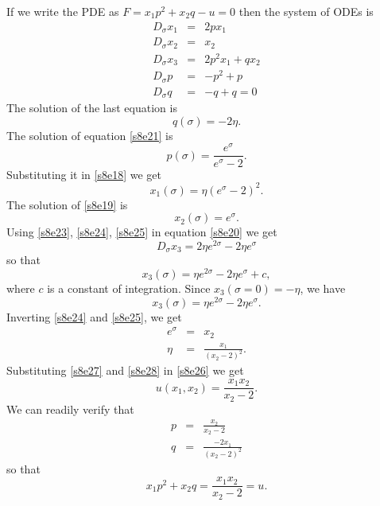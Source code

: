 \documentclass{article}
\theoremstyle{plain}
\numberwithin{thm}{section}
\theoremstyle{plain}
\numberwithin{prop}{section}
\theoremstyle{definition}
\numberwithin{defn}{section}
\theoremstyle{remark}
\numberwithin{equation}{section}
\begin{document}
\begin{enumerate}
If we write the PDE as $F = x_1p^2 + x_2q - u = 0$ then the system of ODEs is
\begin{eqnarray}
D_\sigma x_1 &=& 2px_1 \label{s8e18} \\
D_\sigma x_2 &=& x_2 \label{s8e19} \\
D_\sigma x_3 &=& 2p^2x_1 + qx_2 \label{s8e20} \\
D_\sigma p &=& -p^2 + p \label{s8e21} \\
D_\sigma q &=& -q + q = 0 \label{s8e22}
\end{eqnarray}
The solution of the last equation is 
\begin{equation}\label{s8e23}
q(\sigma) = -2\eta.
\end{equation}
The solution of equation \eqref{s8e21} is
\begin{equation}\label{s8e24}
p(\sigma) = \frac{e^\sigma}{e^\sigma - 2}.
\end{equation}
Substituting it in \eqref{s8e18} we get
\begin{equation}\label{s8e25}
x_1(\sigma) = \eta(e^\sigma - 2)^2.
\end{equation}
The solution of \eqref{s8e19} is 
\begin{equation}\label{s8e26}
x_2(\sigma) = e^\sigma.
\end{equation}
Using \eqref{s8e23}, \eqref{s8e24},
\eqref{s8e25} in equation \eqref{s8e20} we get
\[
D_\sigma x_3 = 2\eta e^{2\sigma} - 2\eta e^\sigma
\]
so that
\[
x_3(\sigma) = \eta e^{2\sigma} - 2\eta e^\sigma + c,
\]
where $c$ is a constant of integration. Since $x_3(\sigma = 0) = -\eta$, we have
\begin{equation}\label{s8e27}
x_3(\sigma) = \eta e^{2\sigma} - 2\eta e^\sigma.
\end{equation}
Inverting \eqref{s8e24} and \eqref{s8e25}, we get
\begin{eqnarray}
e^\sigma &=& x_2 \label{s8e28} \\
\eta &=& \frac{x_1}{(x_2 - 2)^2} \label{s8e29}.
\end{eqnarray}
Substituting \eqref{s8e27} and \eqref{s8e28} in \eqref{s8e26} we get
\begin{equation}\label{s8e30}
u(x_1, x_2) = \frac{x_1x_2}{x_2 - 2}.
\end{equation}
We can readily verify that
\begin{eqnarray*}
p &=& \frac{x_2}{x_2 - 2} \\
q &=& \frac{-2x_1}{(x_2 - 2)^2}
\end{eqnarray*}
so that
\[
x_1 p^2 + x_2 q = \frac{x_1x_2}{x_2 - 2} = u.
\]


\end{enumerate}
\end{document}
